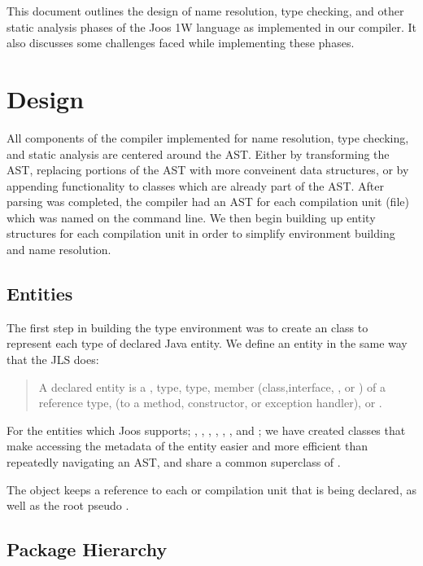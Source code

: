 \documentclass[pdftex,11pt,a4paper]{article}
\begin{document}

This document outlines the design of name resolution, type checking,
and other static analysis phases of the Joos 1W language as
implemented in our compiler. It also discusses some challenges faced
while implementing these phases.


\section{Design}

All components of the compiler implemented for name resolution, type
checking, and static analysis are centered around the AST. Either by
transforming the AST, replacing portions of the AST with more
conveinent data structures, or by appending functionality to classes
which are already part of the AST. After parsing was completed, the
compiler had an AST for each compilation unit (file) which was named
on the command line. We then begin building up entity structures for
each compilation unit in order to simplify environment building
and name resolution.

\subsection{Entities}

The first step in building the type environment was to create an
 class to represent each type of declared Java entity. We
define an entity in the same way that the JLS does:

\begin{quote}
A declared entity is a ,  type,
 type, member (class,interface, , or
) of a reference type,  (to a method,
constructor, or exception handler), or .
\end{quote}

For the entities which Joos supports; , ,
, , , , and
; we have created classes that make accessing the
metadata of the entity easier and more efficient than repeatedly
navigating an AST, and share a common superclass of .

The  object keeps a reference to each  or
 compilation unit that is being declared, as well as
the root pseudo .

\subsection{Package Hierarchy}
\end{document}
